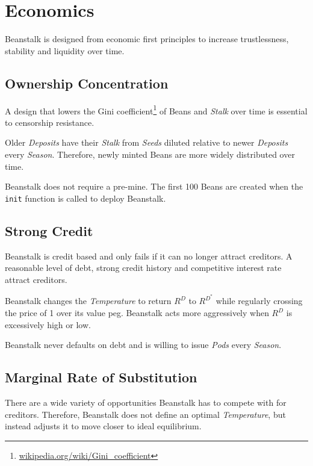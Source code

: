 \documentclass[tikz]{article}
\newcommand{\code}[1]{\texttt{#1}}
\newcommand{\term}[1]{\textsl{#1}}
\newcommand{\fref}[1]{\footnote{\href{http://#1}{#1}}}
\newcommand{\Bean}{} %
\begin{document}
\section{Economics}
Beanstalk is designed from economic first principles to increase trustlessness, stability and liquidity over time.

\vspace*{-1.75mm}
\subsection{Ownership Concentration}
\vspace*{-1.75mm}
A design that lowers the Gini coefficient\fref{wikipedia.org/wiki/Gini\_coefficient} of Beans and \term{Stalk} over time is essential to censorship resistance.

Older \term{Deposits} have their \term{Stalk} from \term{Seeds} diluted relative to newer \term{Deposits} every \term{Season}. Therefore, newly minted Beans are more widely distributed over time.

Beanstalk does not require a pre-mine. The first 100 Beans are created when the \code{init} function is called to deploy Beanstalk.

\vspace*{-1.75mm}
\subsection{Strong Credit}
\vspace*{-1.75mm}
Beanstalk is credit based and only fails if it can no longer attract creditors. A reasonable level of debt, strong credit history and competitive interest rate attract creditors. 

Beanstalk changes the \term{Temperature} to return \hyperlink{ht156}{$R^D$} to $R^{D^*}$ while regularly crossing the price of \Bean1 over its value peg. Beanstalk acts more aggressively when \hyperlink{ht156}{$R^D$} is excessively high or low.

Beanstalk never defaults on debt and is willing to issue \term{Pods} every \term{Season}. 

\vspace*{-1.75mm}
\subsection{Marginal Rate of Substitution}
\vspace*{-1.75mm}
There are a wide variety of opportunities Beanstalk has to compete with for creditors. Therefore, Beanstalk does not define an optimal \term{Temperature}, but instead adjusts it to move closer to ideal equilibrium. 
\end{document}
